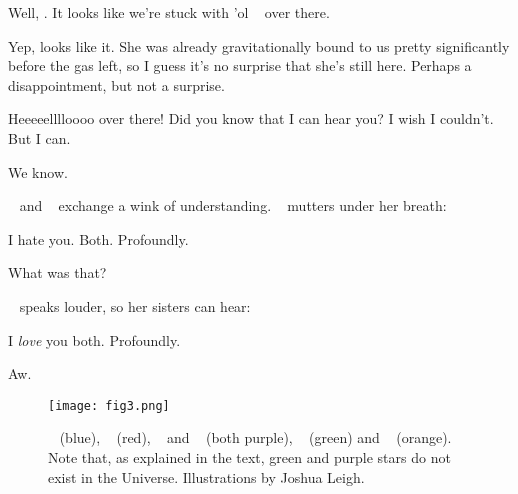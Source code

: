 \documentclass[main.tex]{subfiles}
\begin{document}
\par \Taygete Well, \rmalcyone.  It looks like we're stuck with 'ol \rmcelaeno~ over there.

\par \Alcyone Yep, looks like it.  She was already gravitationally bound to us pretty significantly before the gas left, so I guess it's no surprise that she's still here.  Perhaps a disappointment, but not a surprise.

\par \Celaeno Heeeeelllloooo over there!  Did you know that I can hear you?  I wish I couldn't.  But I can.  

\par \Taygete We know. 

\par \nar \rmtaygete~ and \rmalcyone~ exchange a wink of understanding.  \rmcelaeno~ mutters under her breath:

\par \Celaeno I hate you.  Both.  Profoundly.

\par \Taygete What was that?

\par \nar \rmcelaeno~ speaks louder, so her sisters can hear:

\par \Celaeno I \textit{love} you both.  Profoundly.

\par \Alcyone Aw.

\begin{figure}
\texttt{[image: fig3.png]}
\caption{\rmmaia~ (blue), \rmelectra~ (red), \rmtaygete~ and \rmalcyone~ (both purple), \rmcelaeno~ (green) and \rmsterope~ (orange).  Note that, as explained in the text, green and purple stars do not exist in the Universe.  Illustrations by Joshua Leigh.
\label{fig:fig3}}
\end{figure}
\end{document}
